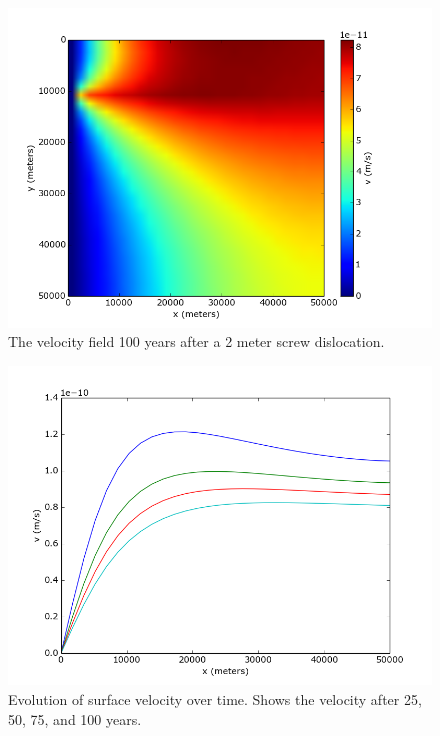 \documentclass[a4paper]{article}
\begin{document}
\begin{figure}[h!]
  \caption{The velocity field 100 years after a 2 meter screw dislocation.}
  \centering
    \includegraphics[width=1.0\textwidth]{velocity_2D.png}
\end{figure}

\begin{figure}[h!]
  \caption{Evolution of surface velocity over time. Shows the velocity after 25, 50, 75, and 100 years.}
  \centering
    \includegraphics[width=1.0\textwidth]{velocity_over_time.png}
\end{figure}
\end{document}
